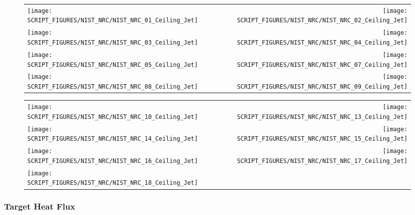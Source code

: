 \begin{figure}[p]
\begin{tabular*}{\textwidth}{l@{\extracolsep{\fill}}r}
\texttt{[image: SCRIPT\_FIGURES/NIST\_NRC/NIST\_NRC\_01\_Ceiling\_Jet]} &
\texttt{[image: SCRIPT\_FIGURES/NIST\_NRC/NIST\_NRC\_02\_Ceiling\_Jet]} \\
\texttt{[image: SCRIPT\_FIGURES/NIST\_NRC/NIST\_NRC\_03\_Ceiling\_Jet]} &
\texttt{[image: SCRIPT\_FIGURES/NIST\_NRC/NIST\_NRC\_04\_Ceiling\_Jet]} \\
\texttt{[image: SCRIPT\_FIGURES/NIST\_NRC/NIST\_NRC\_05\_Ceiling\_Jet]} &
\texttt{[image: SCRIPT\_FIGURES/NIST\_NRC/NIST\_NRC\_07\_Ceiling\_Jet]} \\
\texttt{[image: SCRIPT\_FIGURES/NIST\_NRC/NIST\_NRC\_08\_Ceiling\_Jet]} &
\texttt{[image: SCRIPT\_FIGURES/NIST\_NRC/NIST\_NRC\_09\_Ceiling\_Jet]}
\end{tabular*}
\end{figure}

\begin{figure}[p]
\begin{tabular*}{\textwidth}{l@{\extracolsep{\fill}}r}
\texttt{[image: SCRIPT\_FIGURES/NIST\_NRC/NIST\_NRC\_10\_Ceiling\_Jet]} &
\texttt{[image: SCRIPT\_FIGURES/NIST\_NRC/NIST\_NRC\_13\_Ceiling\_Jet]} \\
\texttt{[image: SCRIPT\_FIGURES/NIST\_NRC/NIST\_NRC\_14\_Ceiling\_Jet]} &
\texttt{[image: SCRIPT\_FIGURES/NIST\_NRC/NIST\_NRC\_15\_Ceiling\_Jet]} \\
\texttt{[image: SCRIPT\_FIGURES/NIST\_NRC/NIST\_NRC\_16\_Ceiling\_Jet]} &
\texttt{[image: SCRIPT\_FIGURES/NIST\_NRC/NIST\_NRC\_17\_Ceiling\_Jet]} \\
\texttt{[image: SCRIPT\_FIGURES/NIST\_NRC/NIST\_NRC\_18\_Ceiling\_Jet]}
\end{tabular*}
\end{figure}

\clearpage

\subsubsection{Target Heat Flux}

